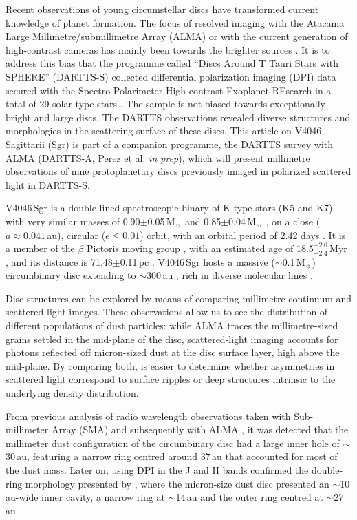 \documentclass[fleqn,usenatbib,useAMS]{mnras}
\begin{document}
Recent observations of young circumstellar discs have transformed current knowledge of planet formation. The focus of resolved imaging with the Atacama Large Millimetre/submillimetre Array (ALMA) or with the current generation of high-contrast cameras has mainly been towards the brighter sources \citep[e.g.][]{2020ARA&A..58..483A}. It is to address this bias that the programme called ``Discs Around T Tauri Stars with SPHERE'' (DARTTS-S) collected differential polarization imaging (DPI) data secured with the Spectro-Polarimeter High-contrast Exoplanet REsearch \citep[SPHERE][]{2019A&A...631A.155B} in a total of 29 solar-type stars \citep[][]{Avenhaus_2018,Garufi2020}. The sample is not biased towards exceptionally bright and large discs. The DARTTS observations revealed diverse structures and morphologies in the scattering surface of these discs. This article on V4046 Sagittarii (Sgr) is part of a companion programme, the DARTTS survey with ALMA (DARTTS-A, Perez et al. {\em in prep}), which will present millimetre observations of nine protoplanetary discs previously imaged in polarized scattered light in DARTTS-S.

V4046\,Sgr is a double-lined spectroscopic binary of K-type stars (K5 and K7) with very similar masses of 0.90$\pm$0.05\,M$_{\sun}$ and 0.85$\pm$0.04\,M$_{\sun}$ \citep{Rosenfeld_2012}, on a close ($a \approx 0.041$\,au), circular ($e\leq0.01$) orbit, with an orbital period of 2.42 days \citep{2000IAUS..200P..28Q}. It is a member of the $\beta$ Pictoris moving group \citep{Zuckerman_2004}, with an estimated age of 18.5$^{+2.0}_{-2.4}$\,Myr \citep{2020A&A...642A.179M}, and its distance is 71.48$\pm$0.11\,pc \citep{gaiacollaboration2020gaia}. V4046\,Sgr hosts a massive ($\sim$0.1\,M$_{\sun}$) circumbinary disc extending to $\sim$300\,au \citep{Rosenfeld_2013, Rodriguez_2010}, rich in diverse molecular lines \citep{Kastner_2018}.

Disc structures can be explored by means of comparing millimetre continuum and scattered-light images. These observations allow us to see the distribution of different populations of dust particles: while ALMA traces the millimetre-sized grains settled in the mid-plane of the disc, scattered-light imaging accounts for photons reflected off micron-sized dust at the disc surface layer, high above the mid-plane. By comparing both, is easier to determine whether asymmetries in scattered light correspond to surface ripples or deep structures intrinsic to the underlying density distribution.

From previous analysis of radio wavelength observations taken with Sub-millimeter Array (SMA) \citep{Rosenfeld_2013} and subsequently with ALMA \citep{Guzman_2017,Huang_2017,Bergner_2018,Kastner_2018}, it was detected that the millimeter dust configuration of the circumbinary disc had a large inner hole of $\sim$30\,au, featuring a narrow ring centred around 37\,au that accounted for most of the dust mass. Later on, \citet{Avenhaus_2018} using DPI in the J and H bands confirmed the double-ring morphology presented by \citet{Rapson_2015}, where the micron-size dust disc presented an $\sim$10\,au-wide inner cavity, a narrow ring at $\sim$14\,au and the outer ring centred at $\sim$27\,au.
\end{document}
